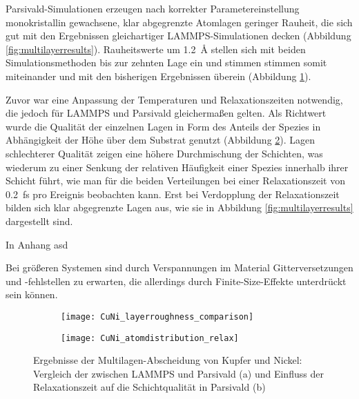 Parsivald-Simulationen erzeugen nach korrekter Parametereinstellung monokristallin gewachsene, klar abgegrenzte Atomlagen geringer Rauheit, die sich gut mit den Ergebnissen gleichartiger LAMMPS-Simulationen decken (Abbildung \ref{fig:multilayerresults}).
Rauheitswerte um \SI{1.2}{\angstrom} stellen sich mit beiden Simulationsmethoden bis zur zehnten Lage ein und stimmen stimmen somit miteinander und mit den bisherigen Ergebnissen überein (Abbildung \ref{fig:multilayerplots-a}).

Zuvor war eine Anpassung der Temperaturen und Relaxationszeiten notwendig, die jedoch für LAMMPS und Parsivald gleichermaßen gelten.
Als Richtwert wurde die Qualität der einzelnen Lagen in Form des Anteils der Spezies in Abhängigkeit der Höhe über dem Substrat genutzt (Abbildung \ref{fig:multilayerplots-b}).
Lagen schlechterer Qualität zeigen eine höhere Durchmischung der Schichten, was wiederum zu einer Senkung der relativen Häufigkeit einer Spezies innerhalb ihrer Schicht führt, wie man für die beiden Verteilungen bei einer Relaxationszeit von \SI{0.2}{\femto\second} pro Ereignis beobachten kann.
Erst bei Verdopplung der Relaxationszeit bilden sich klar abgegrenzte Lagen aus, wie sie in Abbildung \ref{fig:multilayerresults} dargestellt sind.

In Anhang asd


Bei größeren Systemen sind durch Verspannungen im Material Gitterversetzungen und -fehlstellen zu erwarten, die allerdings durch Finite-Size-Effekte unterdrückt sein können.

\begin{figure}
  \captionsetup[subfigure]{singlelinecheck=false}
  \def\subfigwidth{7cm}
  \begin{subfigure}[t]{\subfigwidth}
    \texttt{[image: CuNi\_layerroughness\_comparison]}
    \label{fig:multilayerplots-a}
  \end{subfigure}
  \hfill
  \begin{subfigure}[t]{\subfigwidth}
    \texttt{[image: CuNi\_atomdistribution\_relax]}
    \label{fig:multilayerplots-b}
  \end{subfigure}
  \caption[Ergebnisse der Multilagen-Abscheidung von Kupfer und Nickel]{
    Ergebnisse der Multilagen-Abscheidung von Kupfer und Nickel:
    Vergleich der zwischen LAMMPS und Parsivald (a) und Einfluss der Relaxationszeit auf die Schichtqualität in Parsivald (b)
  }
  \label{fig:multilayerplots}
\end{figure}

